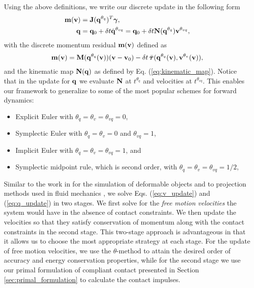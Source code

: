 Using the above definitions, we write our discrete update in the following form
\begin{align}
	\mf{m}(\mf{v}) &= \mf{J}(\mf{q}^{\theta_{q}})^T\mf{\bgamma},
	\label{eq:v_update}\\
	\mf{q} &= \mf{q}_0 + \delta t \dot{\mf{q}}^{\theta_{vq}} = \mf{q}_0 + \delta t\mf{N}(\mf{q}^{\theta_{q}})\mf{v}^{\theta_{vq}},
	\label{eq:q_update}
\end{align}
with the discrete momentum residual ${\mathbf{m}}({\mathbf{v}})$ defined as
\begin{multline}
	\mf{m}(\mf{v}) =
	\mf{M}(\mf{q}^{\theta_{q}}(\mf{v}))(\mf{v}-\mf{v}_0) -
	\delta t\,\bar{\vf{\tau}}(\mf{q}^{\theta_{q}}(\mf{v}), \mf{v}^{\theta_v}(\mf{v})),
	\label{eq:m_definition}
\end{multline}
and the kinematic map ${\mathbf{N}}({\mathbf{q}})$ as defined by Eq.
(\ref{eq:kinematic_map}). Notice that in the update for ${\mathbf{q}}$ we evaluate
${\mathbf{N}}$ at $t^{\theta_{q}}$ and velocities at $t^{\theta_{vq}}$. This enables
our framework to generalize to some of the most popular schemes for forward
dynamics:
\begin{itemize}
	\item Explicit Euler with $\theta_q=\theta_{v}=\theta_{vq} = 0$,
	\item Symplectic Euler with $\theta_{q} = \theta_v = 0$ and $\theta_{vq}=1$,
	\item Implicit Euler with $\theta_{q} = \theta_v = \theta_{vq}= 1$, and
	\item Symplectic midpoint rule, which is second order, with $\theta_{q} =
	\theta_v = \theta_{vq}= 1/2$,
\end{itemize}

Similar to the work in \cite{bib:duriez2005realistic} for the simulation of
deformable objects and to projection methods used in fluid mechanics
\cite{bib::bell1991efficient}, we solve Eqs. (\ref{eq:v_update}) and
(\ref{eq:q_update}) in two stages. We first solve for the \emph{free motion
velocities} the system would have in the absence of contact constraints. We then
update the velocities so that they satisfy conservation of momentum along with
the contact constraints in the second stage. This two-stage approach is
advantageous in that it allows us to choose the most appropriate strategy at
each stage. For the update of free motion velocities, we use the
$\theta\text{-method}$ to attain the desired order of accuracy and energy
conservation properties, while for the second stage we use our primal
formulation of compliant contact presented in Section
\ref{sec:primal_formulation} to calculate the contact impulses.

